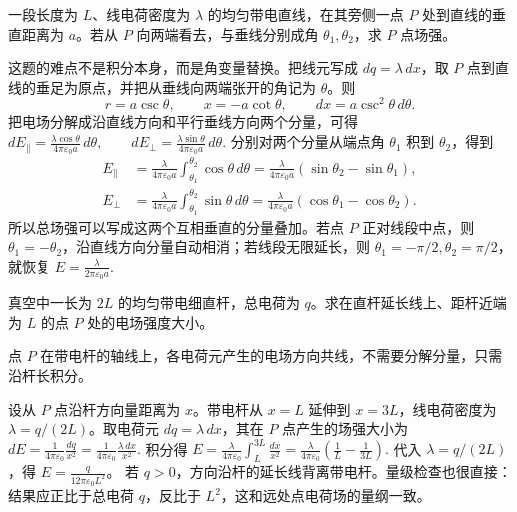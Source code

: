 \documentclass[lang=cn,11pt]{elegantbook}
\begin{document}
\begin{exercise}[有限长均匀带电直线在旁侧一点的场强]
一段长度为 \(L\)、线电荷密度为 \(\lambda\) 的均匀带电直线，在其旁侧一点 \(P\) 处到直线的垂直距离为 \(a\)。若从 \(P\) 向两端看去，与垂线分别成角 \(\theta_1,\theta_2\)，求 \(P\) 点场强。
\end{exercise}

\begin{solution}
这题的难点不是积分本身，而是角变量替换。把线元写成 \(dq=\lambda\,dx\)，取 \(P\) 点到直线的垂足为原点，并把从垂线向两端张开的角记为 \(\theta\)。则
\[
r=a\csc\theta,\qquad x=-a\cot\theta,\qquad dx=a\csc^2\theta\,d\theta.
\]
把电场分解成沿直线方向和平行垂线方向两个分量，可得
 \(dE_\parallel=\frac{\lambda\cos\theta}{4\pi\varepsilon_0 a}\,d\theta, \qquad dE_\perp=\frac{\lambda\sin\theta}{4\pi\varepsilon_0 a}\,d\theta.\) 
分别对两个分量从端点角 \(\theta_1\) 积到 \(\theta_2\)，得到
\[
\begin{aligned}
E_\parallel
&=\frac{\lambda}{4\pi\varepsilon_0 a}
\int_{\theta_1}^{\theta_2}\cos\theta\,d\theta
=\frac{\lambda}{4\pi\varepsilon_0 a}
\left(\sin\theta_2-\sin\theta_1\right),\\
E_\perp
&=\frac{\lambda}{4\pi\varepsilon_0 a}
\int_{\theta_1}^{\theta_2}\sin\theta\,d\theta
=\frac{\lambda}{4\pi\varepsilon_0 a}
\left(\cos\theta_1-\cos\theta_2\right).
\end{aligned}
\]
所以总场强可以写成这两个互相垂直的分量叠加。若点 \(P\) 正对线段中点，则 \(\theta_1=-\theta_2\)，沿直线方向分量自动相消；若线段无限延长，则 \(\theta_1=-\pi/2,\theta_2=\pi/2\)，就恢复
 \(E=\frac{\lambda}{2\pi\varepsilon_0 a}.\) 
\end{solution}

\begin{exercise}
真空中一长为 \(2L\) 的均匀带电细直杆，总电荷为 \(q\)。求在直杆延长线上、距杆近端为 \(L\) 的点 \(P\) 处的电场强度大小。
\end{exercise}

\begin{solution}
点 \(P\) 在带电杆的轴线上，各电荷元产生的电场方向共线，不需要分解分量，只需沿杆长积分。

设从 \(P\) 点沿杆方向量距离为 \(x\)。带电杆从 \(x=L\) 延伸到 \(x=3L\)，线电荷密度为 \(\lambda=q/(2L)\)。取电荷元 \(dq=\lambda\,dx\)，其在 \(P\) 点产生的场强大小为
 \(dE=\frac{1}{4\pi\varepsilon_0}\frac{dq}{x^2} =\frac{1}{4\pi\varepsilon_0}\frac{\lambda\,dx}{x^2}.\) 
积分得
 \(E=\frac{\lambda}{4\pi\varepsilon_0} \int_L^{3L}\frac{dx}{x^2} =\frac{\lambda}{4\pi\varepsilon_0} \left(\frac{1}{L}-\frac{1}{3L}\right).\) 
代入 \(\lambda=q/(2L)\)，得 \(E=\frac{q}{12\pi\varepsilon_0 L^2}\)。
若 \(q>0\)，方向沿杆的延长线背离带电杆。量级检查也很直接：结果应正比于总电荷 \(q\)，反比于 \(L^2\)，这和远处点电荷场的量纲一致。
\end{solution}
\end{document}
